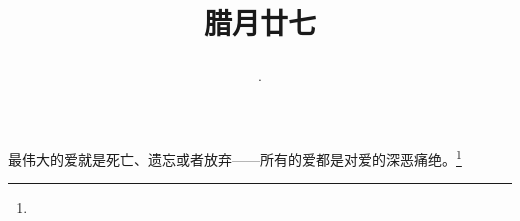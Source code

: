 \title{\date[d=6,m=2,y=2024][year:cn-y,年,month:cn,day:cn,日,·,weekday]·腊月廿七 }
最伟大的爱就是死亡、遗忘或者放弃——所有的爱都是对爱的深恶痛绝。\footnote{ }

